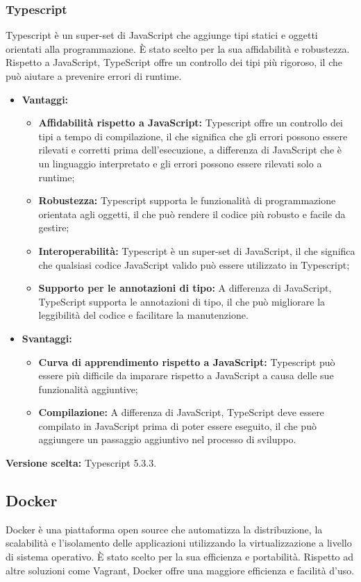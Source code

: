 \documentclass[10pt, a4paper]{article}
\begin{document}
\subsubsection{Typescript}
Typescript è un super-set di JavaScript che aggiunge tipi statici e oggetti orientati alla programmazione. È stato scelto per la sua affidabilità e robustezza. Rispetto a JavaScript, TypeScript offre un controllo dei tipi più rigoroso, il che può aiutare a prevenire errori di runtime.

\begin{itemize}
\item \textbf{Vantaggi:}
\begin{itemize}
\item \textbf{Affidabilità rispetto a JavaScript:} Typescript offre un controllo dei tipi a tempo di compilazione, il che significa che gli errori possono essere rilevati e corretti prima dell'esecuzione, a differenza di JavaScript che è un linguaggio interpretato e gli errori possono essere rilevati solo a runtime;
\item \textbf{Robustezza:} Typescript supporta le funzionalità di programmazione orientata agli oggetti, il che può rendere il codice più robusto e facile da gestire;
\item \textbf{Interoperabilità:} Typescript è un super-set di JavaScript, il che significa che qualsiasi codice JavaScript valido può essere utilizzato in Typescript;
\item \textbf{Supporto per le annotazioni di tipo:} A differenza di JavaScript, TypeScript supporta le annotazioni di tipo, il che può migliorare la leggibilità del codice e facilitare la manutenzione.
\end{itemize}
\item \textbf{Svantaggi:}
\begin{itemize}
\item \textbf{Curva di apprendimento rispetto a JavaScript:} Typescript può essere più difficile da imparare rispetto a JavaScript a causa delle sue funzionalità aggiuntive;
\item \textbf{Compilazione:} A differenza di JavaScript, TypeScript deve essere compilato in JavaScript prima di poter essere eseguito, il che può aggiungere un passaggio aggiuntivo nel processo di sviluppo.
\end{itemize}
\end{itemize}
\textbf{Versione scelta:} Typescript 5.3.3.

\subsection{Docker}
Docker è una piattaforma open source che automatizza la distribuzione, la scalabilità e l'isolamento delle applicazioni utilizzando la virtualizzazione a livello di sistema operativo. È stato scelto per la sua efficienza e portabilità. Rispetto ad altre soluzioni come Vagrant, Docker offre una maggiore efficienza e facilità d'uso.
\end{document}
